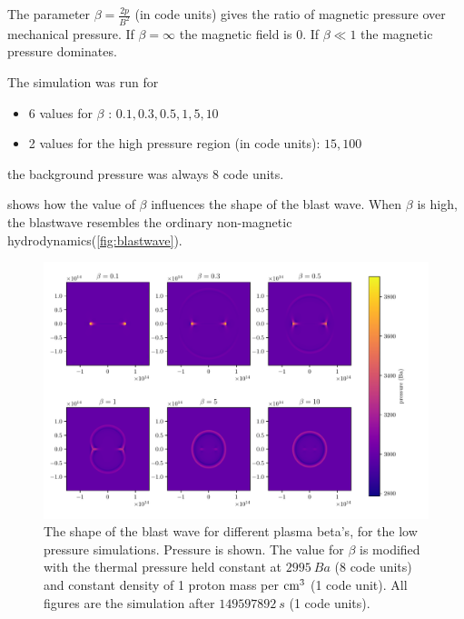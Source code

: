 \documentclass[a4paper]{article}
\numberwithin{figure}{section}
\numberwithin{equation}{section}
\begin{document}
The parameter $\beta = \frac{2p}{B^2}$ (in code units) gives the ratio of magnetic pressure over mechanical pressure. 
If $\beta = \infty$ the magnetic field is $0$. 
If $\beta \ll 1$ the magnetic pressure dominates. 

The simulation was run for 
\begin{itemize}
	\item 6 values for $\beta$ : $0.1, 0.3, 0.5, 1, 5, 10$
	\item 2 values for the high pressure region (in code units): $15, 100$ 
\end{itemize}
the background pressure was always $8$ code units.

 shows how the value of $\beta$ influences the shape of the blast wave. When $\beta$ is high, the blastwave resembles the ordinary non-magnetic hydrodynamics(\cref{fig:blastwave}).
\begin{figure}[H]
	\centering
	\includegraphics[width = \linewidth]{figures/influence_beta.pdf}
	\caption{The shape of the blast wave for different plasma beta's, for the low pressure simulations. Pressure is shown. The value for $\beta$ is modified with the thermal pressure held constant at $\SI{2995}{Ba}$ (8 code units) and constant density of 1 proton mass per  $\si{cm\cubed}$ (1 code unit). All figures are the simulation after $\SI{149597892}{s}$ (1 code units).}
\label{fig:blastwave_shape_beta}
\end{figure}
\end{document}

